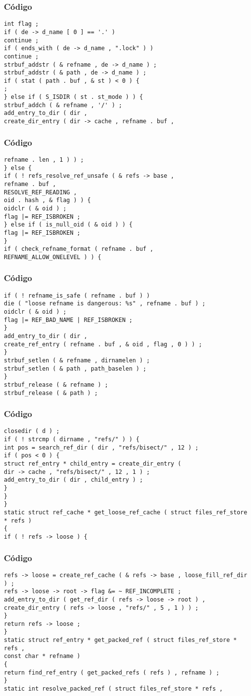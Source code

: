 \documentclass{beamer}
\begin{document}
\begin{frame}[fragile]
\frametitle{C\'odigo}
\begin{verbatim}
int flag ; 
if ( de -> d_name [ 0 ] == '.' ) 
continue ; 
if ( ends_with ( de -> d_name , ".lock" ) ) 
continue ; 
strbuf_addstr ( & refname , de -> d_name ) ; 
strbuf_addstr ( & path , de -> d_name ) ; 
if ( stat ( path . buf , & st ) < 0 ) { 
; 
} else if ( S_ISDIR ( st . st_mode ) ) { 
strbuf_addch ( & refname , '/' ) ; 
add_entry_to_dir ( dir , 
create_dir_entry ( dir -> cache , refname . buf , 
\end{verbatim}
\end{frame}
\begin{frame}[fragile]
\frametitle{C\'odigo}
\begin{verbatim}
refname . len , 1 ) ) ; 
} else { 
if ( ! refs_resolve_ref_unsafe ( & refs -> base , 
refname . buf , 
RESOLVE_REF_READING , 
oid . hash , & flag ) ) { 
oidclr ( & oid ) ; 
flag |= REF_ISBROKEN ; 
} else if ( is_null_oid ( & oid ) ) { 
flag |= REF_ISBROKEN ; 
} 
if ( check_refname_format ( refname . buf , 
REFNAME_ALLOW_ONELEVEL ) ) { 
\end{verbatim}
\end{frame}
\begin{frame}[fragile]
\frametitle{C\'odigo}
\begin{verbatim}
if ( ! refname_is_safe ( refname . buf ) ) 
die ( "loose refname is dangerous: %s" , refname . buf ) ; 
oidclr ( & oid ) ; 
flag |= REF_BAD_NAME | REF_ISBROKEN ; 
} 
add_entry_to_dir ( dir , 
create_ref_entry ( refname . buf , & oid , flag , 0 ) ) ; 
} 
strbuf_setlen ( & refname , dirnamelen ) ; 
strbuf_setlen ( & path , path_baselen ) ; 
} 
strbuf_release ( & refname ) ; 
strbuf_release ( & path ) ; 
\end{verbatim}
\end{frame}
\begin{frame}[fragile]
\frametitle{C\'odigo}
\begin{verbatim}
closedir ( d ) ; 
if ( ! strcmp ( dirname , "refs/" ) ) { 
int pos = search_ref_dir ( dir , "refs/bisect/" , 12 ) ; 
if ( pos < 0 ) { 
struct ref_entry * child_entry = create_dir_entry ( 
dir -> cache , "refs/bisect/" , 12 , 1 ) ; 
add_entry_to_dir ( dir , child_entry ) ; 
} 
} 
} 
static struct ref_cache * get_loose_ref_cache ( struct files_ref_store * refs ) 
{ 
if ( ! refs -> loose ) { 
\end{verbatim}
\end{frame}
\begin{frame}[fragile]
\frametitle{C\'odigo}
\begin{verbatim}
refs -> loose = create_ref_cache ( & refs -> base , loose_fill_ref_dir ) ; 
refs -> loose -> root -> flag &= ~ REF_INCOMPLETE ; 
add_entry_to_dir ( get_ref_dir ( refs -> loose -> root ) , 
create_dir_entry ( refs -> loose , "refs/" , 5 , 1 ) ) ; 
} 
return refs -> loose ; 
} 
static struct ref_entry * get_packed_ref ( struct files_ref_store * refs , 
const char * refname ) 
{ 
return find_ref_entry ( get_packed_refs ( refs ) , refname ) ; 
} 
static int resolve_packed_ref ( struct files_ref_store * refs , 
\end{verbatim}
\end{frame}
\end{document}
